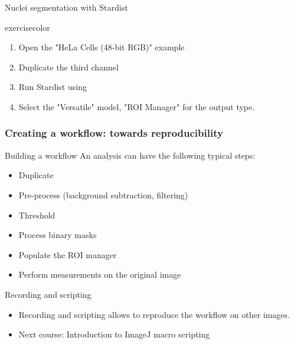 \documentclass[ignorenonframetext,aspectratio=169,10pt,xcolor=table]{beamer}
\begin{document}
\begin{frame}{Nuclei segmentation with Stardist}
  \begin{beamercolorbox}[rounded=true, shadow=true, wd=\textwidth, sep=-0.5em]{exercisecolor}%
    \begin{enumerate}
      \item Open the "HeLa Cells (48-bit RGB)" example
      \item Duplicate the third channel
      \item Run Stardist using 
      \item Select the "Versatile" model, "ROI Manager" for the output type.
    \end{enumerate}
  \end{beamercolorbox}
\end{frame}

\begin{frame} \frametitle{Creating a workflow: towards reproducibility}

  \begin{block}{Building a workflow}
    An analysis can have the following typical steps:
    \begin{itemize}
      \item Duplicate
      \item Pre-process (background subtraction, filtering)
      \item Threshold
      \item Process binary masks
      \item Populate the ROI manager
      \item Perform measurements on the original image
    \end{itemize}
  \end{block}

  \begin{block}{Recording and scripting}
    \begin{itemize}
      \item Recording and scripting allows to reproduce the workflow on other images.
      \item \alert{Next course:} Introduction to ImageJ macro scripting
    \end{itemize}
  \end{block}

\end{frame}
\end{document}
